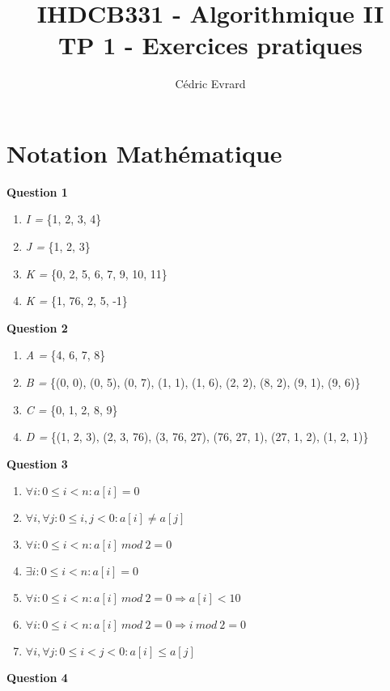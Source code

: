 \documentclass[11pt]{article}
\title{IHDCB331 - Algorithmique II\\
	\large{TP 1 - Exercices pratiques}
}
\author{Cédric Evrard}
\begin{document}
\maketitle

\section{Notation Mathématique}

\textbf{Question 1}
\begin{enumerate}
	\item \textit{I =} \{1, 2, 3, 4\}
	\item \textit{J =} \{1, 2, 3\} 
	\item \textit{K =} \{0, 2, 5, 6, 7, 9, 10, 11\}
	\item \textit{K =} \{1, 76, 2, 5, -1\} 
\end{enumerate}
\textbf{Question 2}
\begin{enumerate}
	\item \textit{A =} \{4, 6, 7, 8\}
	\item \textit{B =} \{(0, 0), (0, 5), (0, 7), (1, 1), (1, 6), (2, 2), (8, 2), (9, 1), (9, 6)\}
	\item \textit{C =} \{0, 1, 2, 8, 9\}
	\item \textit{D =} \{(1, 2, 3), (2, 3, 76), (3, 76, 27), (76, 27, 1), (27, 1, 2), (1, 2, 1)\}
\end{enumerate}
\textbf{Question 3}
\begin{enumerate}
	\item $\forall i : 0 \leq i < n : a[i] = 0$
	\item $\forall i, \forall j : 0 \leq i, j < 0 : a[i] \neq a[j]$
	\item $\forall i : 0 \leq i < n : a[i]\ mod\ 2 = 0$
	\item $\exists i : 0 \leq i < n : a[i] = 0$
	\item $\forall i : 0 \leq i < n : a[i]\ mod\ 2 = 0 \Rightarrow a[i] < 10  $
	\item $\forall i : 0 \leq i < n : a[i]\ mod\ 2 = 0 \Rightarrow i\ mod\ 2 = 0$
	\item $\forall i, \forall j : 0 \leq i < j < 0 : a[i] \leq a[j]$
\end{enumerate}
\textbf{Question 4}
\begin{enumerate}
	\item $x\ =\ min{a[i] \leq i < n \}$ 
	\item $\{a[i]\ |\ 0 \leq i < n \} \subseteq \{b[j]\ |\ 0 \leq j < m \}$
	\item $\{a[i]\ |\ 0 \leq i < n \} \cap \{b[j]\ |\ 0 \leq j < m \} = \emptyset$  
	\item $\{a[i]\ |\ 0 \leq i < n \} \setminus \{b[j]\ |\ 0 \leq j < m \} \neq \emptyset$ 
	\item $\#\{a[i]\ |\ 0 \leq i < n \} \leq 5$
\end{enumerate}
\end{document}
